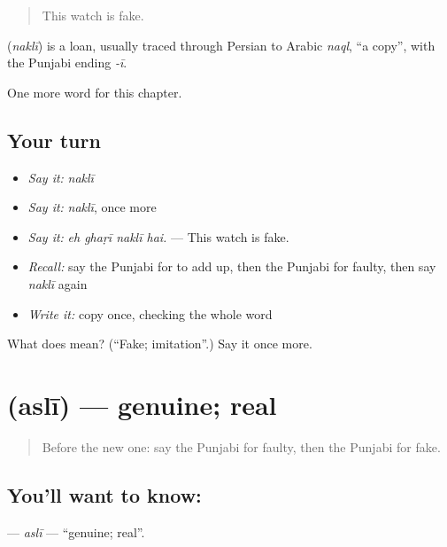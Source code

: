 \begin{quote}
This watch is fake.
\end{quote}

\begin{cousinweb}
\textbf{} (\emph{naklī}) is a loan, usually traced through Persian to Arabic \emph{naql}, \textquotedblleft{}a copy\textquotedblright{}, with the Punjabi ending \emph{-ī}.
\end{cousinweb}

\begin{grammarlens}[title={What you've built}]
One more word for this chapter.
\end{grammarlens}

\subsection*{Your turn}
\begin{itemize}
\raggedright
  \item \emph{Say it:} \emph{naklī}
  \item \emph{Say it:} \emph{naklī}, once more
  \item \emph{Say it:} \emph{eh ghaṛī naklī hai.} — This watch is fake.
  \item \emph{Recall:} say the Punjabi for to add up, then the Punjabi for faulty, then say \emph{naklī} again
  \item \emph{Write it:} copy \textbf{} once, checking the whole word
\end{itemize}

\begin{tcolorbox}[breakable,colback=teal!4,colframe=teal!35!black,title={Before you move on}]
What does  mean? (\textquotedblleft{}Fake; imitation\textquotedblright{}.) Say it once more.
\end{tcolorbox}
\section[\texorpdfstring{\pa{ਅਸਲੀ} (aslī)}{ਅਸਲੀ (aslī)}]{ (aslī) — genuine; real}

\label{lesson:PA-C279-asli}



\begin{quote}
Before the new one: say the Punjabi for faulty, then the Punjabi for fake.
\end{quote}

\subsection*{You'll want to know: }
\textbf{} — \emph{aslī} — \textquotedblleft{}genuine; real\textquotedblright{}.

